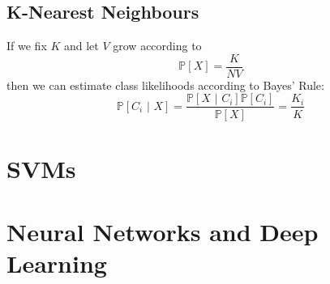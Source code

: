 \documentclass{article}
\renewcommand{\|}{\,\,|\,\,}
\newcommand{\Prob}{\mathbb{P}}
\begin{document}
\subsection{K-Nearest Neighbours}
If we fix $K$ and let $V$ grow according to
\[
  \Prob[X] = \frac{K}{NV}
\]
then we can estimate class likelihoods according to Bayes' Rule:
\[
  \Prob[C_i \| X] = \frac{\Prob[X \| C_i]\Prob[C_i]}{\Prob[X]} = \frac{K_i}{K}
\]
\section{SVMs}


\section{Neural Networks and Deep Learning}
\end{document}
